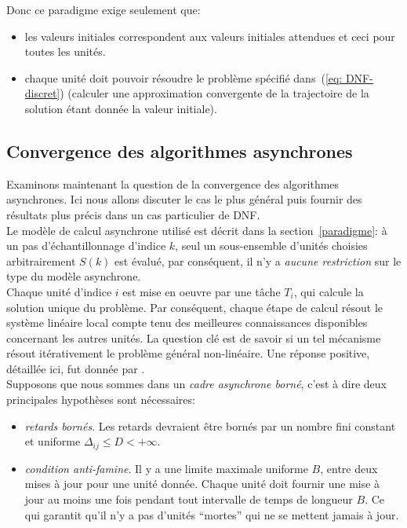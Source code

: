 Donc ce paradigme exige seulement que:

\begin {itemize}
\item[$(i)$]  les valeurs initiales correspondent aux valeurs initiales attendues et ceci pour toutes les unités.
\item[$(ii)$] chaque unité doit pouvoir résoudre le problème spécifié dans~(\ref{eq: DNF-discret}) (calculer une approximation convergente de la trajectoire de la solution étant donnée la valeur initiale). 
\end {itemize}

\subsection{Convergence des algorithmes asynchrones}\label{convergence}

Examinons maintenant la question de la convergence des algorithmes asynchrones. Ici nous allons discuter le cas le plus général puis fournir des résultats plus précis dans un cas particulier de DNF.\\

Le modèle de calcul asynchrone utilisé est décrit dans la section~\ref{paradigme}: à un pas d'échantillonnage d'indice $k$, seul un sous-ensemble d'unités choisies arbitrairement $S(k)$ est évalué, par conséquent, il n'y a {\em aucune restriction} sur le type du modèle asynchrone.\\

Chaque unité d'indice $i$ est mise en oeuvre par une tâche $T_i$, qui calcule la solution unique du problème. Par conséquent, chaque étape de calcul résout le système linéaire local compte tenu des meilleures connaissances disponibles concernant les autres unités. La question clé est de savoir si un tel mécanisme résout itérativement le problème général non-linéaire. Une réponse positive, détaillée ici, fut donnée par \cite{Mitra:1987}.\\

Supposons que nous sommes dans un {\em cadre asynchrone borné}, c'est à dire deux principales hypothèses sont nécessaires:\\

\begin {itemize}
\item [$\bullet$]{\em retards bornés}. Les retards devraient être bornés par un nombre fini constant et uniforme $\Delta_{ij} \le D < +\infty $. 
\item [$\bullet$] {\em condition anti-famine}. Il y a une limite maximale uniforme $B$, entre deux mises à jour pour une unité donnée. Chaque unité doit fournir une mise à jour au moins une fois pendant tout intervalle de temps de longueur $B$. Ce qui garantit qu'il n'y a pas d'unités ``mortes'' qui ne se mettent jamais à jour.\\
\end {itemize}



